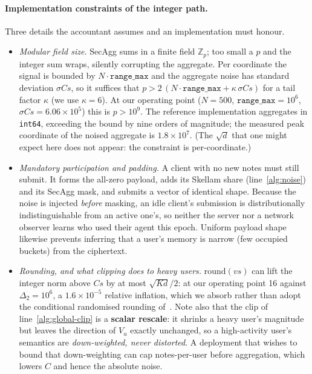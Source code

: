 \documentclass[pdflatex,sn-mathphys-num,12pt]{sn-jnl}
\theoremstyle{thmstyleone}%
\theoremstyle{thmstyletwo}%
\theoremstyle{thmstylethree}%
\newcommand{\Z}{\mathbb{Z}}
\begin{document}
\paragraph{Implementation constraints of the integer path.} Three details the
accountant assumes and an implementation must honour.

\begin{itemize}
  \item \emph{Modular field size.} SecAgg sums in a finite field $\Z_p$; too small
    a $p$ and the integer sum wraps, silently corrupting the aggregate. Per
    coordinate the signal is bounded by $N \cdot \texttt{range\_max}$ and the
    aggregate noise has standard deviation $\sigma C s$, so it suffices that
    $p > 2\,(N \cdot \texttt{range\_max} + \kappa\,\sigma C s)$ for a tail factor
    $\kappa$ (we use $\kappa = 6$). At our operating point ($N = 500$,
    $\texttt{range\_max} = 10^{6}$, $\sigma C s = 6.06 \times 10^{5}$) this is
    $p > 10^{9}$. The reference implementation aggregates in \texttt{int64},
    exceeding the bound by nine orders of magnitude; the measured peak coordinate of
    the noised aggregate is $1.8 \times 10^{7}$. (The $\sqrt{d}$ that one might
    expect here does not appear: the constraint is per-coordinate.)

  \item \emph{Mandatory participation and padding.} A client with no new notes must
    still submit. It forms the all-zero payload, adds its Skellam share
    (line~\ref{alg:noise}) and its SecAgg mask, and submits a vector of identical
    shape. Because the noise is injected \emph{before} masking, an idle client's
    submission is distributionally indistinguishable from an active one's, so
    neither the server nor a network observer learns who used their agent this
    epoch. Uniform payload shape likewise prevents inferring that a user's memory is
    narrow (few occupied buckets) from the ciphertext.

  \item \emph{Rounding, and what clipping does to heavy users.} $\mathrm{round}(v s)$
    can lift the integer norm above $C s$ by at most $\sqrt{K d}/2$: at our operating
    point 16 against $\Delta_2 = 10^{6}$, a $1.6 \times 10^{-5}$ relative inflation,
    which we absorb rather than adopt the conditional randomised rounding
    of~\cite{kairouz2021ddgauss}. Note also that the clip of
    line~\ref{alg:global-clip} is a \textbf{scalar rescale}: it shrinks a heavy
    user's magnitude but leaves the direction of $V_u$ exactly unchanged, so a
    high-activity user's semantics are \emph{down-weighted, never distorted}. A
    deployment that wishes to bound that down-weighting can cap notes-per-user before
    aggregation, which lowers $C$ and hence the absolute noise.
\end{itemize}
\end{document}
